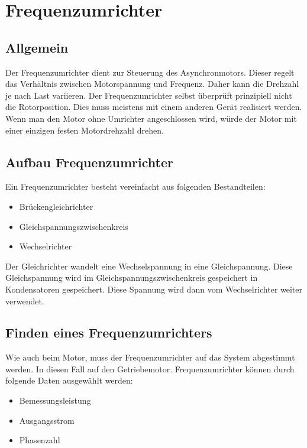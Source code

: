 \documentclass[12pt]{scrreprt} %
\begin{document}
\section{Frequenzumrichter}
\label{sec:frequenzumrichter}

\subsection{Allgemein}
\label{sec:allgemeinfrequenzumrichter}

Der Frequenzumrichter dient zur Steuerung des Asynchronmotors. Dieser regelt das Verhältnis zwischen Motorspannung und Frequenz. Daher kann die Drehzahl je  nach Last variieren. Der Frequenzumrichter selbst überprüft prinzipiell nicht die Rotorposition. Dies muss meistens mit einem anderen Gerät realisiert werden. Wenn man den Motor ohne Umrichter angeschlossen wird, würde der Motor mit einer einzigen festen Motordrehzahl drehen. 

\subsection{Aufbau Frequenzumrichter}
\label{sec:aufbauFrequenzumrichter}

Ein Frequenzumrichter besteht vereinfacht aus folgenden Bestandteilen:

\begin{itemize}
	\item{Brückengleichrichter}
	\item{Gleichspannungszwischenkreis}
	\item{Wechselrichter}
\end{itemize}

Der Gleichrichter wandelt eine Wechselspannung in eine Gleichspannung. Diese Gleichspannung wird im Gleichspannungszwischenkreis gespeichert in Kondensatoren gespeichert. Diese Spannung wird dann vom Wechselrichter weiter verwendet.

\subsection{Finden eines Frequenzumrichters}
\label{sec:findenEinesFrequenzumrichter}

Wie auch beim Motor, muss der Frequenzumrichter auf das System abgestimmt werden. In diesen Fall auf den Getriebemotor. Frequenzumrichter können durch folgende Daten ausgewählt werden:

\begin{itemize}
	\item{Bemessungsleistung}
	\item{Ausgangsstrom}
	\item{Phasenzahl}
\end{itemize}
\end{document}
